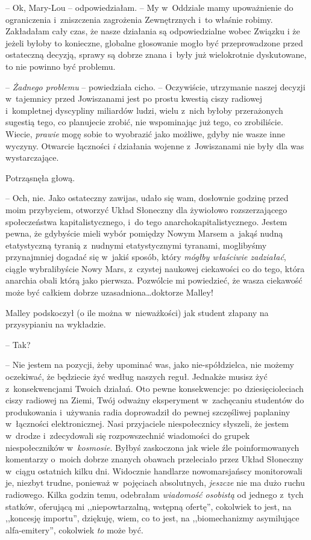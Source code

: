 \documentclass[oneside,polish,11pt,sfheadings]{mwbk}
\begin{document}
-- Ok, Mary-Lou -- odpowiedziałam. -- My w~Oddziale mamy upoważnienie do
ograniczenia i~zniszczenia zagrożenia Zewnętrznych i~to właśnie robimy.
Zakładałam cały czas, że nasze działania są odpowiedzialne wobec Związku
i że jeżeli byłoby to konieczne, globalne głosowanie mogło być
przeprowadzone przed ostateczną decyzją, sprawy są dobrze znana i~były
już wielokrotnie dyskutowane, to nie powinno być problemu.

-- \textit{Żadnego problemu }-- powiedziała cicho. -- Oczywiście, utrzymanie
naszej decyzji w~tajemnicy przed Jowiszanami jest po prostu kwestią
ciszy radiowej i~kompletnej dyscypliny miliardów ludzi, wielu z~nich
byłoby przerażonych sugestią tego, co planujecie zrobić, nie wspominając
już tego, co zrobiliście. Wiecie, \textit{prawie} mogę sobie to wyobrazić
jako możliwe, gdyby nie wasze inne wyczyny. Otwarcie łączności \textit{i
}działania wojenne z~Jowiszanami nie były dla was wystarczające.

Potrząsnęła głową. 

-- Och, nie. Jako ostateczny zawijas, udało się wam,
dosłownie godzinę przed moim przybyciem, otworzyć Układ Słoneczny dla
żywiołowo rozszerzającego społeczeństwa kapitalistycznego, i~do tego
anarchokapitalistycznego. Jestem pewna, że gdybyście mieli wybór
pomiędzy Nowym Marsem a~jakąś nudną etatystyczną tyranią z~nudnymi
etatystycznymi tyranami, moglibyśmy przynajmniej dogadać się w~jakiś
sposób, który \textit{mógłby właściwie zadziałać}, ciągle wybralibyście
Nowy Mars, z~czystej naukowej ciekawości co do tego, która anarchia
obali którą jako pierwsza. Pozwólcie mi powiedzieć, że wasza ciekawość
może być całkiem dobrze uzasadniona\ldots  doktorze Malley!

Malley podskoczył (o ile można w~nieważkości) jak student złapany na
przysypianiu na wykładzie.

-- Tak?

-- Nie jestem na pozycji, żeby upominać was, jako nie-spółdzielca, nie
możemy oczekiwać, że będziecie żyć według naszych reguł. Jednakże musisz
żyć z~konsekwencjami Twoich działań. Oto pewne konsekwencje: po
dziesięcioleciach ciszy radiowej na Ziemi, Twój odważny eksperyment w~zachęcaniu studentów do produkowania i~używania radia doprowadził do
pewnej szczęśliwej paplaniny w~łączności elektronicznej. Nasi
przyjaciele niespołecznicy słyszeli, że jestem w~drodze i~zdecydowali
się rozpowszechnić wiadomości do grupek niespołeczników w~\textit{kosmosie}. Byłbyś zaskoczona jak wiele źle poinformowanych
komentarzy o~moich dobrze znanych obawach przeleciało przez Układ
Słoneczny w~ciągu ostatnich kilku dni. Widocznie handlarze
nowomarsjańscy monitorowali je, niezbyt trudne, ponieważ w~pojęciach
absolutnych, \textit{jeszcze} nie ma dużo ruchu radiowego. Kilka godzin
temu, odebrałam \textit{wiadomość osobistą} od jednego z~tych statków,
oferującą mi ,,niepowtarzalną, wstępną ofertę'', cokolwiek to jest, na
,,koncesję importu'', dziękuję, wiem, co to jest, na ,,biomechanizmy
asymilujące alfa-emitery'', cokolwiek \textit{to} może być.
\end{document}
